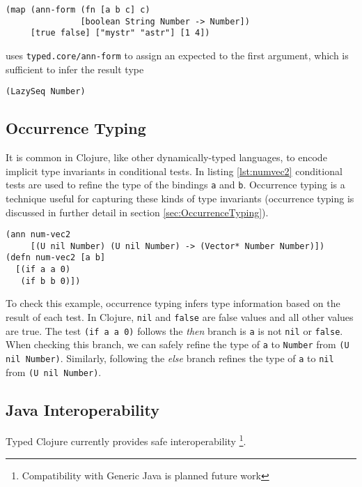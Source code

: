 \begin{lstlisting}
(map (ann-form (fn [a b c] c) 
               [boolean String Number -> Number]) 
     [true false] ["mystr" "astr"] [1 4])
\end{lstlisting}

uses \lstinline|typed.core/ann-form| to assign an expected to
the first argument,
which is sufficient to infer the result type

\begin{lstlisting}
(LazySeq Number)
\end{lstlisting}


\subsection{Occurrence Typing}

It is common in Clojure, like other dynamically-typed languages, to
encode implicit type invariants in conditional tests.
In listing \ref{lst:numvec2} conditional tests are used
to refine the type of the bindings \lstinline|a| and \lstinline|b|.
Occurrence typing is a technique useful for capturing these kinds
of type invariants (occurrence typing is discussed in further detail in section \ref{sec:OccurrenceTyping}).

\begin{lstlisting}[caption=Example of occurrence typing in Typed Clojure, label=lst:numvec2]
(ann num-vec2 
     [(U nil Number) (U nil Number) -> (Vector* Number Number)])
(defn num-vec2 [a b]
  [(if a a 0) 
   (if b b 0)])
\end{lstlisting}

To check this example, occurrence typing infers type information based on the result of each test.
In Clojure, \lstinline|nil| and \lstinline|false| are false values and all other values are true.
The test \lstinline|(if a a 0)| follows the \emph{then} branch is \lstinline|a| is not \lstinline|nil|
or \lstinline|false|. When checking this branch, we can safely refine the type of \lstinline|a| to \lstinline|Number| from
\lstinline|(U nil Number)|. Similarly, following the \emph{else} branch refines the type of \lstinline|a|
to \lstinline|nil| from \lstinline|(U nil Number)|.

\subsection{Java Interoperability}

Typed Clojure currently provides safe interoperability
\footnote{Compatibility with Generic Java is planned future work}.

